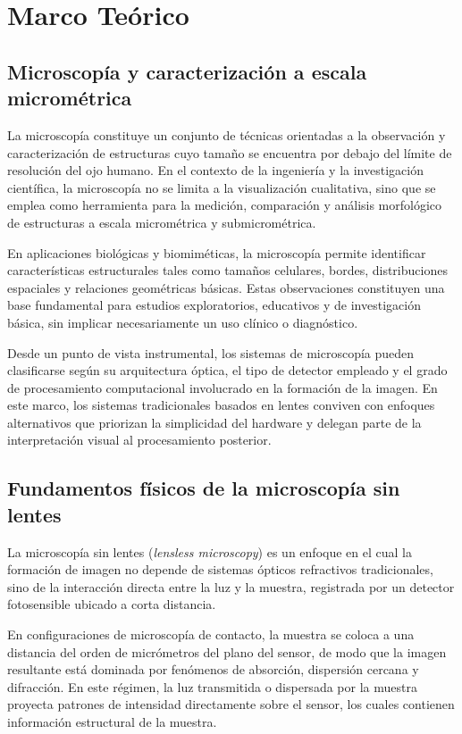 ﻿\chapter{Marco Teórico}

\section{Microscopía y caracterización a escala micrométrica}

La microscopía constituye un conjunto de técnicas orientadas a la observación y caracterización de estructuras cuyo tamaño se encuentra por debajo del límite de resolución del ojo humano. En el contexto de la ingeniería y la investigación científica, la microscopía no se limita a la visualización cualitativa, sino que se emplea como herramienta para la medición, comparación y análisis morfológico de estructuras a escala micrométrica y submicrométrica.

En aplicaciones biológicas y biomiméticas, la microscopía permite identificar características estructurales tales como tamaños celulares, bordes, distribuciones espaciales y relaciones geométricas básicas. Estas observaciones constituyen una base fundamental para estudios exploratorios, educativos y de investigación básica, sin implicar necesariamente un uso clínico o diagnóstico.

Desde un punto de vista instrumental, los sistemas de microscopía pueden clasificarse según su arquitectura óptica, el tipo de detector empleado y el grado de procesamiento computacional involucrado en la formación de la imagen. En este marco, los sistemas tradicionales basados en lentes conviven con enfoques alternativos que priorizan la simplicidad del hardware y delegan parte de la interpretación visual al procesamiento posterior.

\section{Fundamentos físicos de la microscopía sin lentes}

La microscopía sin lentes (\textit{lensless microscopy}) es un enfoque en el cual la formación de imagen no depende de sistemas ópticos refractivos tradicionales, sino de la interacción directa entre la luz y la muestra, registrada por un detector fotosensible ubicado a corta distancia.

En configuraciones de microscopía de contacto, la muestra se coloca a una distancia del orden de micrómetros del plano del sensor, de modo que la imagen resultante está dominada por fenómenos de absorción, dispersión cercana y difracción. En este régimen, la luz transmitida o dispersada por la muestra proyecta patrones de intensidad directamente sobre el sensor, los cuales contienen información estructural de la muestra.


